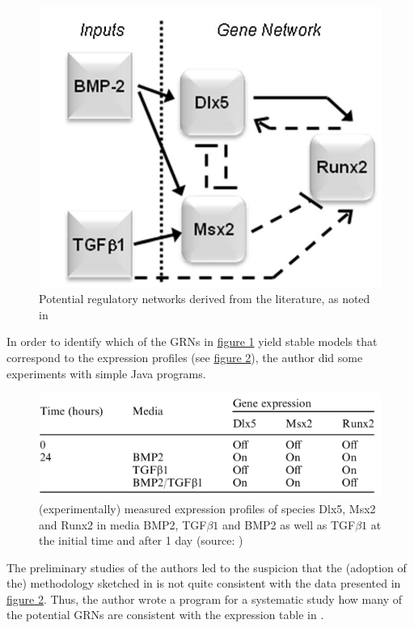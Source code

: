 \documentclass[11pt]{article}
\begin{document}
\begin{figure}[!htb]
	\centering
	\includegraphics[scale=0.25]{regulatory_network.jpg}
	\caption{\label{GRNs} Potential regulatory networks derived from the literature, as noted in \cite{Kirkham}}
\end{figure} 

In order to identify which of the GRNs in \hyperref[GRNs]{figure 1} yield stable models that correspond to the expression profiles (see \hyperref[table1]{figure 2}), the author did some experiments with simple Java programs.

\begin{figure}[!htb]
  \centering
  \includegraphics[scale=0.25]{table1.jpg} 
  \caption{\label{table1} (experimentally) measured expression profiles of species Dlx5, Msx2 and Runx2 in media BMP2, TGF$\beta1$ and BMP2 as well as TGF$\beta1$ at the initial time and after 1 day (source: \cite{Kirkham})}
\end{figure}

The preliminary studies of the authors led to the suspicion that the (adoption of the) methodology sketched in \cite{Kirkham} is not quite consistent with the data presented in \hyperref[table1]{figure 2}. 
Thus, the author wrote a program for a systematic study how many of the potential GRNs are consistent with the expression table in \cite{Kirkham}.
\end{document}
